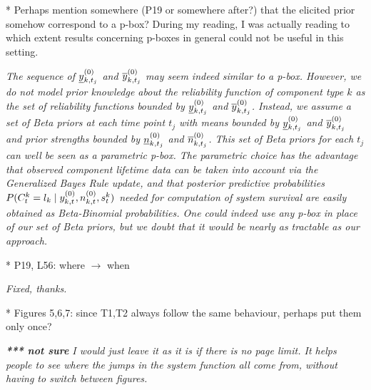 \documentclass[12pt, a4paper]{elsarticle}
\begin{document}
* Perhaps mention somewhere (P19 or somewhere after?) that the elicited prior somehow correspond to a p-box? During my reading, I was actually reading to which extent results concerning p-boxes in general could not be useful in this setting.

\medskip
\emph{The sequence of $\underline{y}^{(0)}_{k,t_j}$ and $\overline{y}^{(0)}_{k,t_j}$ may seem indeed similar to a p-box.
However, we do not model prior knowledge about the reliability function of component type $k$
as the set of reliability functions bounded by $\underline{y}^{(0)}_{k,t_j}$ and $\overline{y}^{(0)}_{k,t_j}$.
Instead, we assume a set of Beta priors at each time point $t_j$ with means bounded by $\underline{y}^{(0)}_{k,t_j}$ and $\overline{y}^{(0)}_{k,t_j}$
and prior strengths bounded by $\underline{n}^{(0)}_{k,t_j}$ and $\overline{n}^{(0)}_{k,t_j}$.
This set of Beta priors for each $t_j$ can well be seen as a parametric p-box.
The parametric choice has the advantage that observed component lifetime data can be taken into account via the Generalized Bayes Rule update,
and that posterior predictive probabilities $P(C^k_t = l_k \mid y^{(0)}_{k,t}, n^{(0)}_{k,t}, s^k_t)$ needed for computation of system survival
are easily obtained as Beta-Binomial probabilities.
One could indeed use any p-box in place of our set of Beta priors,
but we doubt that it would be nearly as tractable as our approach.
}
\medskip

* P19, L56: where $\to$ when

\medskip
\emph{Fixed, thanks.}
\medskip

* Figures 5,6,7: since T1,T2 always follow the same behaviour, perhaps put them only once?

\medskip
\emph{\textbf{*** not sure} I would just leave it as it is if there is no page limit.
It helps people to see where the jumps in the system function all come from, without having to switch between figures.}
\medskip
\end{document}
